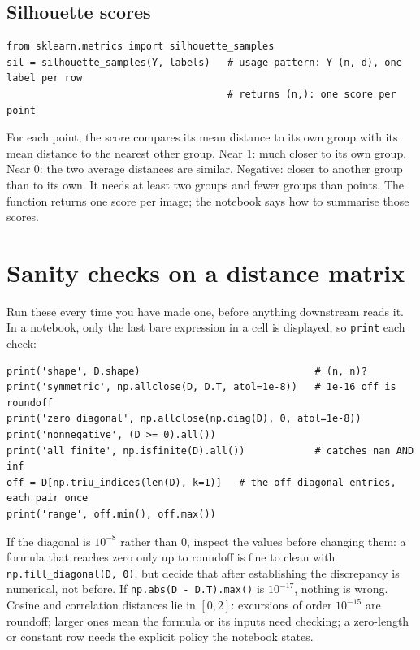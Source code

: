 \documentclass[11pt]{article}
\begin{document}
\subsection{Silhouette scores}

\begin{codebox}
\begin{verbatim}
from sklearn.metrics import silhouette_samples
sil = silhouette_samples(Y, labels)   # usage pattern: Y (n, d), one label per row
                                      # returns (n,): one score per point
\end{verbatim}
\end{codebox}

For each point, the score compares its mean distance to its own group with its mean
distance to the nearest other group. Near 1: much closer to its own group. Near 0: the
two average distances are similar. Negative: closer to another group than to its own.
It needs at least two groups and fewer groups than points. The function returns one score
per image; the notebook says how to summarise those scores.

\section{Sanity checks on a distance matrix}\label{sec:checks}

Run these every time you have made one, before anything downstream reads it. In a
notebook, only the last bare expression in a cell is displayed, so \texttt{print} each
check:

\begin{codebox}
\begin{verbatim}
print('shape', D.shape)                              # (n, n)?
print('symmetric', np.allclose(D, D.T, atol=1e-8))   # 1e-16 off is roundoff
print('zero diagonal', np.allclose(np.diag(D), 0, atol=1e-8))
print('nonnegative', (D >= 0).all())
print('all finite', np.isfinite(D).all())            # catches nan AND inf
off = D[np.triu_indices(len(D), k=1)]   # the off-diagonal entries, each pair once
print('range', off.min(), off.max())
\end{verbatim}
\end{codebox}

If the diagonal is $10^{-8}$ rather than $0$, inspect the values before changing them:
a formula that reaches zero only up to roundoff is fine to clean with
\texttt{np.fill\_diagonal(D, 0)}, but decide that after establishing the discrepancy is
numerical, not before. If \texttt{np.abs(D - D.T).max()} is $10^{-17}$, nothing is wrong.
Cosine and correlation distances lie in $[0, 2]$: excursions of order $10^{-15}$ are
roundoff; larger ones mean the formula or its inputs need checking; a zero-length or
constant row needs the explicit policy the notebook states.
\end{document}
